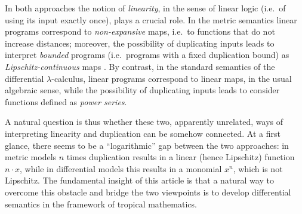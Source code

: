 In both approaches the notion of \emph{linearity}, in the sense of linear logic \cite{linearlogic} (i.e.~of using its input exactly once), plays a crucial role.
In the metric semantics linear programs correspond to \emph{non-expansive} maps, i.e.~to functions that do not increase distances; moreover, the possibility of duplicating inputs leads to interpret \emph{bounded} programs (i.e.~programs with a fixed duplication bound) as \emph{Lipschitz-continuous} maps \cite{Gabo2017}.
By contrast, in the standard semantics of the differential $\lambda$-calculus, linear programs correspond to linear maps, in the usual algebraic sense, while the possibility of duplicating inputs leads to consider functions defined as \emph{power series}.


A natural question is thus whether these two, apparently unrelated, ways of interpreting linearity and duplication can be somehow connected. At a first glance, there seems to be a  ``logarithmic'' gap between the two approaches:
in metric models $n$ times duplication results in a linear (hence Lipschitz) function $n\cdot x$, while in differential models this results in a monomial $x^{n}$, which is not Lipschitz. The fundamental insight of this article is that a natural way to overcome 
this obstacle and bridge the two viewpoints 
is to develop differential semantics in the framework of 
tropical mathematics.
%
%
%



